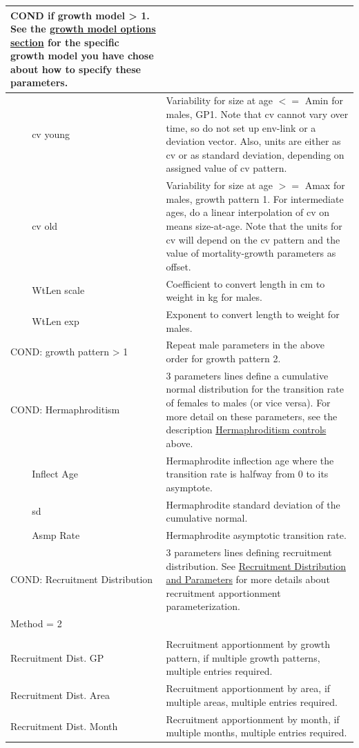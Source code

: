 \begin{longtable}{p{1cm} p{2.25cm} p{10cm}}
	\multicolumn{2}{l}{COND if growth model > 1. See the \hyperlink{GrowthModelOptions}{growth model options section} for the specific growth model you have chose about how to specify these parameters.} & \Tstrut\\
	\hline

	\Tstrut & \gls{cv} young & Variability for size at age $<=$ Amin for males, GP1. Note that \gls{cv} cannot vary over time, so do not set up env-link or a deviation vector. Also, units are either as \gls{cv} or as standard deviation, depending on assigned value of \gls{cv} pattern. \\
	& \gls{cv} old & Variability for size at age $>=$ Amax for males, growth pattern 1. For intermediate ages, do a linear interpolation of \gls{cv} on means size-at-age. Note that the units for \gls{cv} will depend on the \gls{cv} pattern and the value of mortality-growth parameters as offset. \\
	\hline

	\Tstrut & WtLen scale & Coefficient to convert length in cm to weight in kg for males. \\
	& WtLen exp & Exponent to convert length to weight for males. \Bstrut\\

	\multicolumn{2}{l}{COND: growth pattern > 1} \Tstrut & Repeat male parameters in the above order for growth pattern 2. \\
	\hline

	\multicolumn{2}{l}{\hypertarget{HermaphroditeBiology}{COND: Hermaphroditism}} \Tstrut & 3 parameters lines define a cumulative normal distribution for the transition rate of females to males (or vice versa). For more detail on these parameters, see the description \hyperlink{Hermaphroditism}{Hermaphroditism controls} above.\\
	& Inflect Age & Hermaphrodite inflection age where the transition rate is halfway from 0 to its asymptote. \\
	& \gls{sd} & Hermaphrodite standard deviation of the cumulative normal. \\
	& Asmp Rate & Hermaphrodite asymptotic transition rate. \Bstrut\\
	\hline

	\multicolumn{2}{l}{COND: Recruitment Distribution} \Tstrut & 3 parameters lines defining recruitment distribution. See \hyperlink{recdist}{Recruitment Distribution and Parameters} for more details about recruitment apportionment parameterization. \\
	\multicolumn{2}{l}{Method = 2} \Tstrut & \\
	& & \\
	\multicolumn{2}{l}{Recruitment Dist. GP} \Tstrut & Recruitment apportionment by growth pattern, if multiple growth patterns, multiple entries required. \\
	\multicolumn{2}{l}{Recruitment Dist. Area} & Recruitment apportionment by area, if multiple areas, multiple entries required. \\
	\multicolumn{2}{l}{Recruitment Dist. Month} & Recruitment apportionment by month, if multiple months, multiple entries required. \Bstrut\\
	\hline


\end{longtable}
